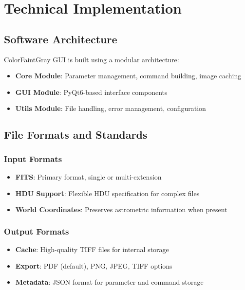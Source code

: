 \documentclass[11pt,a4paper]{article}
\begin{document}
\section{Technical Implementation}

\subsection{Software Architecture}

ColorFaintGray GUI is built using a modular architecture:

\begin{itemize}[leftmargin=*]
\item \textbf{Core Module}: Parameter management, command building, image
caching
\item \textbf{GUI Module}: PyQt6-based interface components
\item \textbf{Utils Module}: File handling, error management, configuration
\end{itemize}

\subsection{File Formats and Standards}

\subsubsection{Input Formats}

\begin{itemize}[leftmargin=*]
\item \textbf{FITS}: Primary format, single or multi-extension
\item \textbf{HDU Support}: Flexible HDU specification for complex files
\item \textbf{World Coordinates}: Preserves astrometric information when
present
\end{itemize}

\subsubsection{Output Formats}

\begin{itemize}[leftmargin=*]
\item \textbf{Cache}: High-quality TIFF files for internal storage
\item \textbf{Export}: PDF (default), PNG, JPEG, TIFF options
\item \textbf{Metadata}: JSON format for parameter and command storage
\end{itemize}
\end{document}
